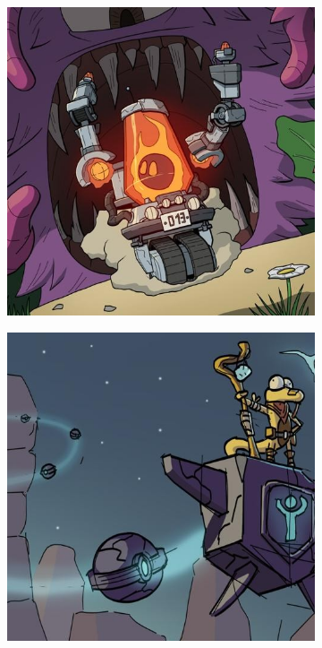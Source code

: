 \documentclass{article}
\begin{document}
\begin{figure}[h]
    \centering
        \begin{subfigure}[b]{0.24\textwidth}
         \centering
         \includegraphics[width=\textwidth]{plots/process/original/0000.jpg}
     \end{subfigure}
     \hfill
     \begin{subfigure}[b]{0.24\textwidth}
         \centering
         \includegraphics[width=\textwidth]{plots/process/original/0001.jpg}

\end{subfigure}
\end{figure}
\end{document}
